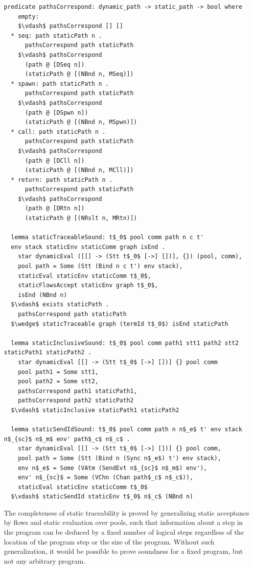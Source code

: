 \documentclass[letterpaper, 11pt]{extarticle}
\begin{document}
\begin{lstlisting}[language=logic, mathescape]
  predicate pathsCorrespond: dynamic_path -> static_path -> bool where
    empty:
    $\vdash$ pathsCorrespond [] []
  * seq: path staticPath n .
      pathsCorrespond path staticPath
    $\vdash$ pathsCorrespond
      (path @ [DSeq n])
      (staticPath @ [(NBnd n, MSeq)])
  * spawn: path staticPath n .
      pathsCorrespond path staticPath
    $\vdash$ pathsCorrespond
      (path @ [DSpwn n])
      (staticPath @ [(NBnd n, MSpwn)])
  * call: path staticPath n .
      pathsCorrespond path staticPath
    $\vdash$ pathsCorrespond
      (path @ [DCll n])
      (staticPath @ [(NBnd n, MCll)])
  * return: path staticPath n .
      pathsCorrespond path staticPath
    $\vdash$ pathsCorrespond
      (path @ [DRtn n])
      (staticPath @ [(NRslt n, MRtn)])

  lemma staticTraceableSound: t$_0$ pool comm path n c t'
  env stack staticEnv staticComm graph isEnd .
    star dynamicEval ([[] -> (Stt t$_0$ [->] [])], {}) (pool, comm), 
    pool path = Some (Stt (Bind n c t') env stack),
    staticEval staticEnv staticComm t$_0$,
    staticFlowsAccept staticEnv graph t$_0$,
    isEnd (NBnd n)
  $\vdash$ exists staticPath . 
    pathsCorrespond path staticPath
  $\wedge$ staticTraceable graph (termId t$_0$) isEnd staticPath

  lemma staticInclusiveSound: t$_0$ pool comm path1 stt1 path2 stt2 staticPath1 staticPath2 . 
    star dynamicEval [[] -> (Stt t$_0$ [->] [])] {} pool comm
    pool path1 = Some stt1, 
    pool path2 = Some stt2, 
    pathsCorrespond path1 staticPath1, 
    pathsCorrespond path2 staticPath2
  $\vdash$ staticInclusive staticPath1 staticPath2

  lemma staticSendIdSound: t$_0$ pool comm path n n$_e$ t' env stack n$_{sc}$ n$_m$ env' path$_c$ n$_c$ .
    star dynamicEval [[] -> (Stt t$_0$ [->] [])] {} pool comm, 
    pool path = Some (Stt (Bind n (Sync n$_e$) t') env stack), 
    env n$_e$ = Some (VAtm (SendEvt n$_{sc}$ n$_m$) env'), 
    env' n$_{sc}$ = Some (VChn (Chan path$_c$ n$_c$)), 
    staticEval staticEnv staticComm t$_0$
  $\vdash$ staticSendId staticEnv t$_0$ n$_c$ (NBnd n)
\end{lstlisting}

The completeness of static traceability is proved by generalizing
static acceptance by flows and static evaluation over pools, such that information about a step in
the program can be deduced by a fixed number of logical steps regardless of the location of the
program step or the size of the program. Without such generalization, it would be possible to
prove soundness for a fixed program, but not any arbitrary program.
\end{document}
